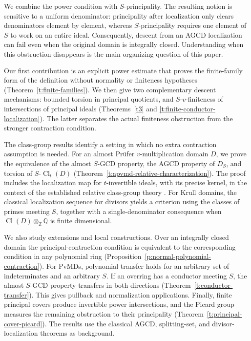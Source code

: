 \documentclass[11pt]{amsart}
\theoremstyle{definition}
\theoremstyle{remark}
\DeclareMathOperator{\Cl}{Cl}
\newcommand{\ZZ}{\mathbb Z}
\newcommand{\QQ}{\mathbb Q}
\begin{document}
We combine the power condition with $S$-principality. The resulting
notion is sensitive to a uniform denominator: principality after
localization only clears denominators element by element, whereas
$S$-principality requires one element of $S$ to work on an entire ideal.
Consequently, descent from an AGCD localization can fail even when
the original domain is integrally closed. Understanding when this
obstruction disappears is the main organizing question of this paper.

Our first contribution is an explicit power estimate that proves the
finite-family form of the definition without normality or finiteness
hypotheses (Theorem~\ref{t:finite-families}). We then give two complementary
descent mechanisms: bounded torsion in principal quotients, and
$S$-$v$-finiteness of intersections of principal ideals
(Theorems~\ref{t3} and \ref{t:finite-conductor-localization}).
The latter separates the actual finiteness obstruction from the
stronger contraction condition.

The class-group results identify a setting in which no extra
contraction assumption is needed. For an almost Pr\"ufer
$v$-multiplication domain $D$, we prove the equivalence of the
almost $S$-GCD property, the AGCD property of $D_S$, and torsion of
$S\text{-}\Cl_t(D)$ (Theorem~\ref{t:apvmd-relative-characterization}).
The proof includes the localization map for $t$-invertible ideals,
with its precise kernel, in the context of the established relative
class-group theory \cite{HamedNagata, Hamed}.
For Krull domains, the classical localization sequence for divisors
\cite{Fossum} yields a criterion using the classes of primes meeting
$S$, together with a single-denominator consequence when
$\Cl(D)\otimes_{\ZZ}\QQ$ is finite dimensional.

We also study extensions and local constructions. Over an integrally
closed domain the principal-contraction condition is equivalent to
the corresponding condition in any polynomial ring
(Proposition~\ref{p:normal-polynomial-contraction}).
For PvMDs, polynomial transfer holds for an arbitrary set of
indeterminates and an arbitrary $S$.
If an overring has a conductor meeting $S$, the almost $S$-GCD
property transfers in both directions
(Theorem~\ref{t:conductor-transfer}). This gives pullback and
normalization applications. Finally, finite principal covers produce
invertible power intersections, and the Picard group measures the
remaining obstruction to their principality
(Theorem~\ref{t:principal-cover-picard}).
The results use the classical AGCD, splitting-set, and
divisor-localization theorems as background.
\end{document}
